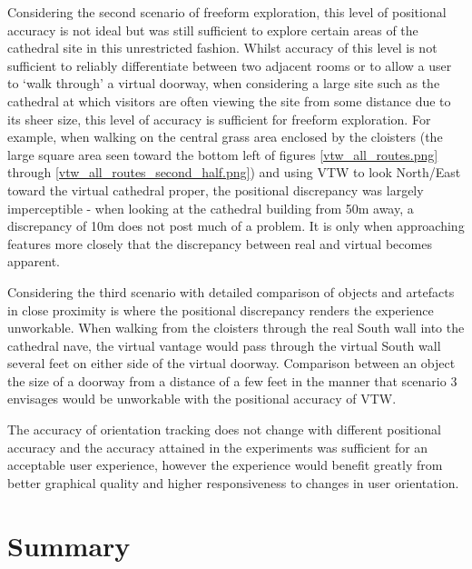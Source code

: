 Considering the second scenario of freeform exploration, this level of positional accuracy is not ideal but was still sufficient to explore certain areas of the cathedral site in this unrestricted fashion. Whilst accuracy of this level is not sufficient to reliably differentiate between two adjacent rooms or to allow a user to `walk through' a virtual doorway, when considering a large site such as the cathedral at which visitors are often viewing the site from some distance due to its sheer size, this level of accuracy is sufficient for freeform exploration. For example, when walking on the central grass area enclosed by the cloisters (the large square area seen toward the bottom left of figures \ref{vtw_all_routes.png} through \ref{vtw_all_routes_second_half.png}) and using VTW to look North/East toward the virtual cathedral proper, the positional discrepancy was largely imperceptible - when looking at the cathedral building from 50m away, a discrepancy of 10m does not post much of a problem. It is only when approaching features more closely that the discrepancy between real and virtual becomes apparent.

Considering the third scenario with detailed comparison of objects and artefacts in close proximity is where the positional discrepancy renders the experience unworkable. When walking from the cloisters through the real South wall into the cathedral nave, the virtual vantage would pass through the virtual South wall several feet on either side of the virtual doorway. Comparison between an object the size of a doorway from a distance of a few feet in the manner that scenario 3 envisages would be unworkable with the positional accuracy of VTW.

The accuracy of orientation tracking does not change with different positional accuracy and the accuracy attained in the experiments was sufficient for an acceptable user experience, however the experience would benefit greatly from better graphical quality and higher responsiveness to changes in user orientation.


\section{Summary}

